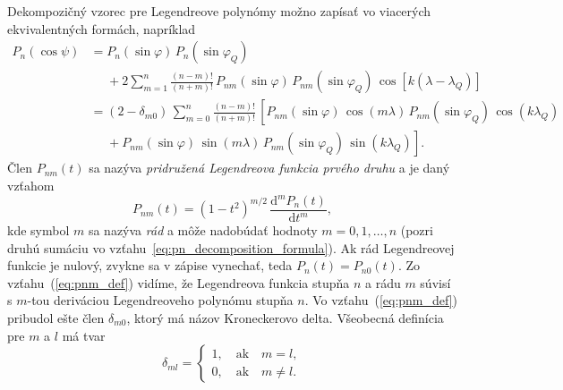 \documentclass[a4paper, 12pt]{book}
\newcommand{\diff}{\mathrm d}
\begin{document}
Dekompozičný vzorec pre Legendreove polynómy možno zapísať vo viacerých 
ekvivalentných formách, napríklad 
\citep{Hobson,MoritzPhysicalGeodesy,SansoGeoidDetermination}
%
\begin{equation}
\label{eq:pn_decomposition_formula}
\begin{split}
P_n(\cos\psi) &= P_n(\sin\varphi) \, P_n(\sin\varphi_Q)\\
%
&\phantom{={}} +2 \sum_{m = 1}^{n} \frac{(n - m)!}{(n + m)!} \, 
P_{nm}(\sin\varphi) \, P_{nm}(\sin\varphi_Q) \, \cos\left[k (\lambda 
- \lambda_Q) \right]\\
%
&= (2 - \delta_{m0}) \, \sum_{m = 0}^{n} \frac{(n - m)!}{(n + m)!} \, \left[ 
P_{nm}(\sin\varphi) \, \cos(m\lambda) \, P_{nm}(\sin\varphi_Q) \, 
\cos(k\lambda_Q)\right.\\
%
&\phantom{={}}+\left. P_{nm}(\sin\varphi) \, \sin(m\lambda) \, 
P_{nm}(\sin\varphi_Q) \, \sin(k\lambda_Q)\right]{.}
\end{split}
\end{equation}
%
Člen $P_{nm}(t)$ sa nazýva \emph{pridružená Legendreova funkcia prvého druhu} 
a je daný vzťahom
%
\begin{equation}
\label{eq:pnm_def}
P_{nm}(t) = (1 - t^2)^{m \slash 2} \, \frac{\diff^m P_n(t)}{\diff t^m}{,}
\end{equation}
%
kde symbol $m$ sa nazýva \emph{rád} a môže nadobúdať hodnoty $m = 0, 1, \dots, 
n$ (pozri druhú sumáciu vo vzťahu~\ref{eq:pn_decomposition_formula}).  Ak rád 
Legendreovej funkcie je nulový, zvykne sa v zápise vynechať, teda $P_n(t) 
= P_{n0}(t)$.  Zo vzťahu~(\ref{eq:pnm_def}) vidíme, že Legendreova funkcia 
stupňa $n$ a rádu $m$ súvisí s $m$-tou deriváciou Legendreoveho polynómu stupňa 
$n$.  Vo vzťahu~(\ref{eq:pnm_def}) pribudol ešte člen $\delta_{m0}$, ktorý má 
názov Kroneckerovo delta.  Všeobecná definícia pre $m$ a $l$ má tvar
%
\begin{equation}
\delta_{ml} =
%
\begin{cases}
1{,} \quad \mathrm{ak} \quad m = l{,}\\
0{,} \quad \mathrm{ak} \quad m \neq l{.}
\end{cases}
\end{equation}
\end{document}
